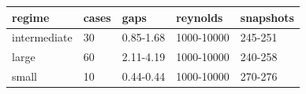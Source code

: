 \begin{tabular}{lllll}
\hline
regime & cases & gaps & reynolds & snapshots \\
\hline
intermediate & 30 & 0.85-1.68 & 1000-10000 & 245-251 \\
large & 60 & 2.11-4.19 & 1000-10000 & 240-258 \\
small & 10 & 0.44-0.44 & 1000-10000 & 270-276 \\
\hline
\end{tabular}
